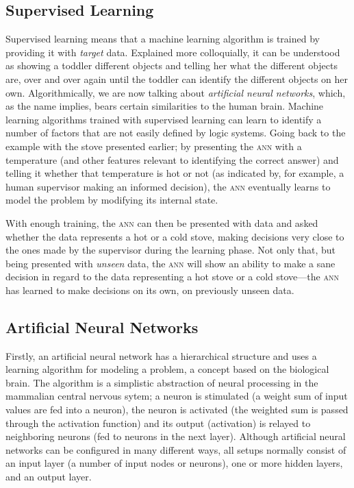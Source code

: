 \begin{multicols}{2}
\subsection{Supervised Learning}

Supervised learning means that a machine learning algorithm is trained by
providing it with \textit{target} data.  Explained more colloquially, it can be
understood as showing a toddler different objects and telling her what the
different objects are, over and over again until the toddler can identify the
different objects on her own.  Algorithmically, we are now talking about
\textit{artificial neural networks}, which, as the name implies, bears certain
similarities to the human brain.  Machine learning algorithms trained with
supervised learning can learn to identify a number of factors that are not
easily defined by logic systems.  Going back to the example with the stove
presented earlier; by presenting the \textsc{ann} with a temperature (and other
features relevant to identifying the correct answer) and telling it whether that
temperature is hot or not (as indicated by, for example, a human supervisor
making an informed decision), the \textsc{ann} eventually learns to model the
problem by modifying its internal state.

With enough training, the \textsc{ann} can then be presented with data and asked
whether the data represents a hot or a cold stove, making decisions very close
to the ones made by the supervisor during the learning phase.  Not only that,
but being presented with \textit{unseen} data, the \textsc{ann} will show an
ability to make a sane decision in regard to the data representing a hot stove
or a cold stove---the \textsc{ann} has learned to make decisions on its own, on
previously unseen data.

\subsection{Artificial Neural Networks}

Firstly, an artificial neural network has a hierarchical structure and uses a
learning algorithm for modeling a problem, a concept based on the biological
brain.  The algorithm is a simplistic abstraction of neural processing in the
mammalian central nervous sytem; a neuron is stimulated (a weight sum of input
values are fed into a neuron), the neuron is activated (the weighted sum is
passed through the activation function) and its output (activation) is relayed
to neighboring neurons (fed to neurons in the next layer).  Although artificial
neural networks can be configured in many different ways, all setups normally
consist of an input layer (a number of input nodes or neurons), one or more
hidden layers, and an output layer.


\end{multicols}
